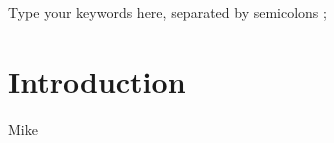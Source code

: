 \documentclass[3p,times,procedia,number]{elsarticle}
\begin{document}
\begin{frontmatter}
\begin{keyword}
Type your keywords here, separated by semicolons ;




\end{keyword}
\end{frontmatter}




\section{Introduction}
{\color{red} Mike}
\end{document}

